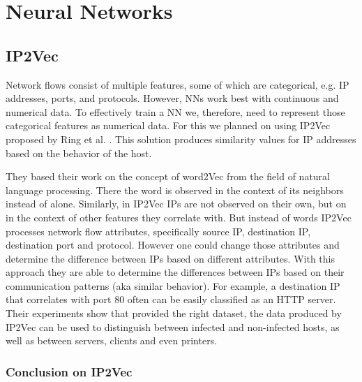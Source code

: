 \documentclass[
	ngerman,
	ruledheaders=section,%
	class=report,%
	thesis={type=bachelor},%
	accentcolor=9c,%
	custommargins=true,%
	marginpar=false,%
	parskip=half-,%
	fontsize=11pt,%
]{tudapub}
\begin{document}


\section{Neural Networks}

\subsection{IP2Vec}

Network flows consist of multiple features, some of which are categorical, e.g. IP addresses, ports, and protocols.
However, NNs work best with continuous and numerical data.
To effectively train a NN we, therefore, need to represent those categorical features as numerical data.
For this we planned on using IP2Vec proposed by Ring et al. \cite{ringIP2VecLearningSimilarities2017}.
This solution produces similarity values for IP addresses based on the behavior of the host.

They based their work on the concept of word2Vec from the field of natural language processing.
There the word is observed in the context of its neighbors instead of alone.
Similarly, in IP2Vec IPs are not observed on their own, but on in the context of other features they correlate with.
But instead of words IP2Vec processes network flow attributes,
specifically source IP, destination IP, destination port and protocol.
However one could change those attributes and determine the difference between IPs based on different attributes.
With this approach they are able to determine the differences between IPs based on their communication patterns (aka similar behavior).
For example, a destination IP that correlates with port 80 often can be easily classified as an HTTP server.
Their experiments show that provided the right dataset, the data produced by IP2Vec can be used to distinguish between infected and non-infected hosts, as well as between servers, clients and even printers.

\subsubsection{Conclusion on IP2Vec}

\end{document}
